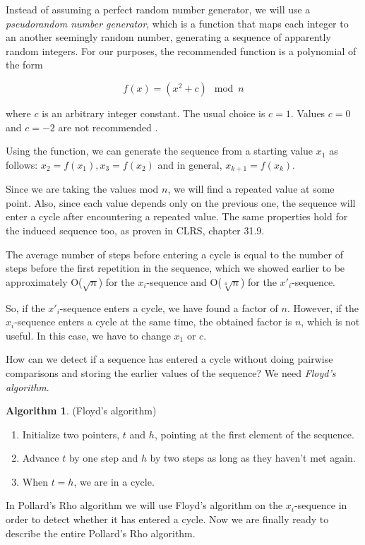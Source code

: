 \documentclass[12pt] {article}
\theoremstyle{plain}
\theoremstyle{definition}
\newtheorem{algo}[thm]{Algorithm}
\begin{document}
Instead of assuming a perfect random number generator, we will use a \textit{pseudorandom number generator}, which is a function that maps each integer to an another seemingly random number, generating a sequence of apparently random integers. For our purposes, the recommended function is a polynomial of the form

\[
	f(x) = (x^2 + c) \mod n
\]

where $c$ is an arbitrary integer constant. The usual choice is $c = 1$. Values $c = 0$ and $c = -2$ are not recommended \cite{pollard}.

Using the function, we can generate the sequence from a starting value $x_1$ as follows: $x_2 = f(x_1), x_3 = f(x_2)$ and in general, $x_{k+1} = f(x_k)$.

Since we are taking the values mod $n$, we will find a repeated value at some point. Also, since each value depends only on the previous one, the sequence will enter a cycle after encountering a repeated value. The same properties hold for the induced sequence too, as proven in CLRS, chapter 31.9\cite{clrs}.

The average number of steps before entering a cycle is equal to the number of steps before the first repetition in the sequence, which we showed earlier to be approximately O($\sqrt{n}$) for the $x_i$-sequence and O($\sqrt[4]{n}$) for the $x'_i$-sequence.

So, if the $x'_i$-sequence enters a cycle, we have found a factor of $n$. However, if the $x_i$-sequence enters a cycle at the same time, the obtained factor is $n$, which is not useful. In this case, we have to change $x_1$ or $c$.

How can we detect if a sequence has entered a cycle without doing pairwise comparisons and storing the earlier values of the sequence? We need \textit{Floyd's algorithm}\cite{cphb}.

\begin{algo} (Floyd's algorithm)
\begin{enumerate}
\item Initialize two pointers, $t$ and $h$, pointing at the first element of the sequence.
\item Advance $t$ by one step and $h$ by two steps as long as they haven't met again.
\item When $t = h$, we are in a cycle.
\end{enumerate}
\end{algo}

In Pollard's Rho algorithm we will use Floyd's algorithm on the $x_i$-sequence in order to detect whether it has entered a cycle. Now we are finally ready to describe the entire Pollard's Rho algorithm.
\end{document}
